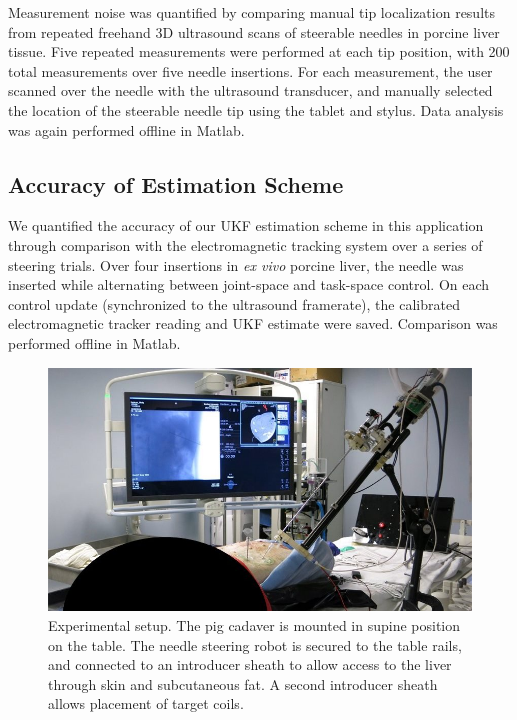 Measurement noise was quantified by comparing manual tip localization results from repeated freehand 3D ultrasound scans of steerable needles in porcine liver tissue. Five repeated measurements were performed at each tip position, with 200 total measurements over five needle insertions. For each measurement, the user scanned over the needle with the ultrasound transducer, and manually selected the location of the steerable needle tip using the tablet and stylus. Data analysis was again performed offline in Matlab.

\subsection{Accuracy of Estimation Scheme}
We quantified the accuracy of our UKF estimation scheme in this application through comparison with the electromagnetic tracking system over a series of steering trials. Over four insertions in \textit{ex vivo} porcine liver, the needle was inserted while alternating between joint-space and task-space control. On each control update (synchronized to the ultrasound framerate), the calibrated electromagnetic tracker reading and UKF estimate were saved. Comparison was performed offline in Matlab.

\begin{figure}[!t]
\centering
\includegraphics[width = \columnwidth]{./Images/Chapter5/CadaverSetup/CadaverSetup.jpg}%
\caption[Experimental setup for pre-clinical needle steering]{Experimental setup. The pig cadaver is mounted in supine position on the table. The needle steering robot is secured to the table rails, and connected to an introducer sheath to allow access to the liver through skin and subcutaneous fat. A second introducer sheath allows placement of target coils.}
\label{fig:CadaverSetup}
\end{figure}

